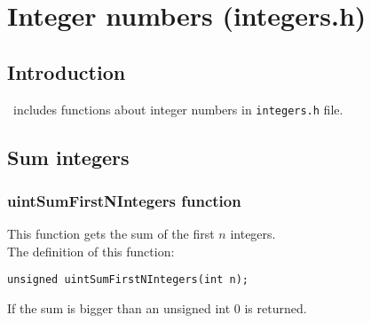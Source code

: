 %
%

\chapter{Integer numbers (integers.h)} \label{ch:integers}

\section{Introduction}

\BI \ includes functions about integer numbers in \texttt{integers.h} file.\\

\section{Sum integers}

\subsection{\textbf{uintSumFirstNIntegers} function} \label{sec:uintSumFirstNIntegers}

This function gets the sum of the first $n$ integers.\\

The definition of this function:
%
\begin{verbatim}
unsigned uintSumFirstNIntegers(int n);
\end{verbatim}
%
If the sum is bigger than an unsigned int $0$ is returned.
